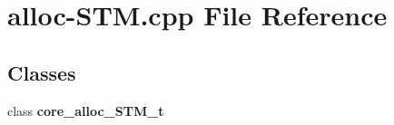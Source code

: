 \section{alloc-STM.cpp File Reference}
\label{alloc-STM_8cpp}
\subsection*{Classes}
\begin{CompactItemize}
\item 
class {\bf core\_\-alloc\_\-STM\_\-t}
\end{CompactItemize}
